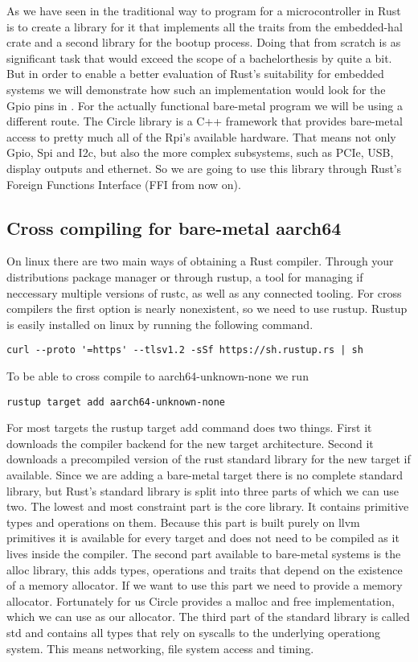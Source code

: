 As we have seen in  the traditional way to program for a microcontroller in Rust
is to create a library for it that implements all the traits from the embedded-hal crate and a second library for the bootup process.
Doing that from scratch is as significant task that would exceed the scope of a bachelorthesis by quite a bit.
But in order to enable a better evaluation of Rust's suitability for embedded systems we will demonstrate how such an implementation would look for the Gpio pins in .
For the actually functional bare-metal program we will be using a different route.
The Circle library is a C++ framework that provides bare-metal access to pretty much all of the Rpi's available hardware.
That means not only Gpio, Spi and I2c, but also the more complex subsystems, such as PCIe, USB, display outputs and ethernet.
So we are going to use this library through Rust's Foreign Functions Interface (FFI from now on).

\subsection{Cross compiling for bare-metal aarch64}
\label{sec:concept_and_implementation:bare-metal:cross}

On linux there are two main ways of obtaining a Rust compiler.
Through your distributions package manager or through rustup,
a tool for managing if neccessary multiple versions of rustc, as well as any connected tooling.
For cross compilers the first option is nearly nonexistent, so we need to use rustup.
Rustup is easily installed on linux by running the following command.
\begin{verbatim}
curl --proto '=https' --tlsv1.2 -sSf https://sh.rustup.rs | sh
\end{verbatim}
To be able to cross compile to aarch64-unknown-none we run
\begin{verbatim}
rustup target add aarch64-unknown-none
\end{verbatim}
For most targets the rustup target add command does two things.
First it downloads the compiler backend for the new target architecture.
Second it downloads a precompiled version of the rust standard library for the new target if available.
Since we are adding a bare-metal target there is no complete standard library, but Rust's standard library is split into three parts of which we can use two.
The lowest and most constraint part is the core library.
It contains primitive types and operations on them.
Because this part is built purely on llvm primitives it is available for every target and does not need to be compiled as it lives inside the compiler.
The second part available to bare-metal systems is the alloc library, this adds types,
operations and traits that depend on the existence of a memory allocator.
If we want to use this part we need to provide a memory allocator.
Fortunately for us Circle provides a malloc and free implementation, which we can use as our allocator.
The third part of the standard library is called std and contains all types that rely on syscalls to the underlying operationg system.
This means networking, file system access and timing.

